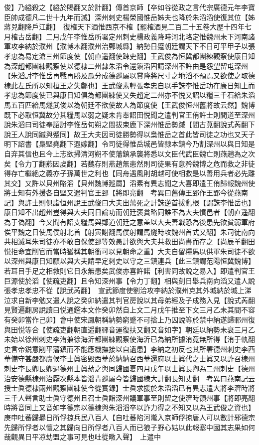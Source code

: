 俊】乃縊殺之【縊於賜翻又於計翻】傳首京師【卒如谷從政之言代宗廣德元年李寶臣帥成德凡二世十九年而滅】深州刺史楊榮國惟岳姊夫也降於朱滔滔使復其位【姊蔣兕翻降戶江翻】　復榷天下酒惟西京不榷【罷榷酒見二百二十五卷大歷十四年七月榷古岳翻】二月戊午李惟岳所署定州刺史楊政義降時河北略定惟魏州未下河南諸軍攻李納於濮州【濮博木翻濮州治鄄城縣】納勢日蹙朝廷謂天下不日可平甲子以張孝忠為易定滄三州節度使【朝直遥翻使踈吏翻】王武俊為恒冀都團練觀察使康日知為深趙都團練觀察使以德棣二州隸朱滔令還鎭滔固請深州不許由是怨望留屯深州【朱滔討李惟岳再戰再勝及瓜分成德廵屬以賞降將尺寸之地滔不預焉又欲使之取德棣此左氏所以知桓王之失鄭也】王武俊素輕張孝忠自以手誅李惟岳功在康日知上而孝忠為節度使已與康日知俱為都團練使又失趙定二州亦不悦又詔以糧三千石給朱滔馬五百匹給馬燧武俊以為朝廷不欲使故人為節度使【王武俊恒州舊將故云然】魏博既下必取恒冀故分其糧馬以弱之疑未肯奉詔田悦聞之遣判官王侑許士則間道至深州說朱滔曰司徒奉詔討李惟岳旬朔之間拔束鹿下深州惟岳勢䠞【間古莧翻說式芮翻下說王人說同䠞與蹙同】故王大夫因司徒勝勢得以梟惟岳之首此皆司徒之功也又天子明下詔書【梟堅堯翻下遐嫁翻】令司徒得惟岳城邑皆隸本鎮今乃割深州以與日知是自弃其信也且今上志欲掃清河朔不使藩鎮承襲將悉以文臣代武臣魏亡則燕趙為之次矣【令力丁翻燕因䖍翻】若魏存則燕趙無患然則司徒果有意矜魏博之危而救之非徒得存亡繼絶之義亦子孫萬世之利也【同舟遇風則胡越可使相救是以善用兵者必先離其交】又許以貝州賂滔【貝州魏博廵屬】滔素有異志聞之大喜即遣王侑歸報魏州使將士知有外援各自堅又遣判官王郅【將即亮翻　考異曰舊傳王郅作王郢今從燕南記】與許士則俱詣恒州說王武俊曰大夫出萬死之計誅逆首拔亂根【謂誅李惟岳也】康日知不出趙州豈得與大夫同日論功而朝廷褒賞略同誰不為大夫憤邑者【朝直遥翻為于偽翻】今又聞有詔支糧馬與鄰道朝廷之意盖以大夫善戰恐為後患先欲貧弱軍府俟平魏之日使馬僕射北首【射寅謝翻馬僕射謂馬燧時攻魏州首式又翻】朱司徒南向共相滅耳朱司徒亦不敢自保使郅等效愚計欲與大夫共救田尚書而存之【尚辰羊翻田悦拒命宜削官而當時猶稱其朝銜可以見朝命之重】大夫自留糧馬以供軍朱司徒不欲以深州與康日知願以與大夫請早定刺史以守之三鎮連兵【此三鎮謂范陽恒冀魏博】若耳目手足之相救則它日永無患矣武俊亦喜許諾【利害同故說之易入】即遣判官王巨源使於滔【使疏吏翻】且令知深州事【令力丁翻】相與刻日舉兵南向滔又遣人說張孝忠孝忠不從【說武芮翻】　宣武節度使劉洽攻李納於濮州克其外城納於城上涕泣求自新李勉又遣人說之癸卯納遣其判官房說以其母弟經及子成務入見【說式芮翻見賢遍翻房說讀曰悦通鑑本文作癸卯然自上文二月戊午推至下文三月乙未其間不容有癸卯當作己卯】會中使宋鳳朝稱納勢窮蹙不可捨上乃囚說等於禁中納遂歸鄆州復與田悦等合【使疏吏翻朝直遥翻鄆音運復扶又翻又音如字】朝廷以納勢未衰三月乙未始以徐州刺史李洧兼徐海沂都團練觀察使海沂已為納所據洧竟無所得【洧于軌翻史言帝鋭意削平藩鎮而不能應機撫接以自遺患】李納之初反也其所署德州刺史李西華備守甚嚴都虞候李士眞密毁西華於納納召西華還府以士眞代之士眞又以詐召棣州刺史李長卿長卿過德州士眞劫之與同歸國夏四月戊午以士眞長卿為二州刺史【德州治安德縣棣州治厭次縣本皆淄青廵屬今皆歸國棣大計翻長知丈翻　考異曰燕南記云授士眞德棣兩州觀察團練使今從實録】士眞求援於朱滔滔已有異志遣大將李濟時將三千人聲言助士眞守德州且召士眞詣深州議軍事至則留之使濟時領州事【將即亮翻時將音同上又音如字德宗以德棣與朱滔滔卒以詐力得之不知又以為王武俊之資也】　庚申吐蕃歸曏日所俘掠兵民八百人【自吐蕃陷河隴入京師俘掠唐人可以數計邪德宗先歸所俘者以懷之其歸向日所俘者八百人而已狼子野心姑以此報塞中國其志果如何哉觀異日平凉劫盟之事可見也吐從暾入聲】　上遣中